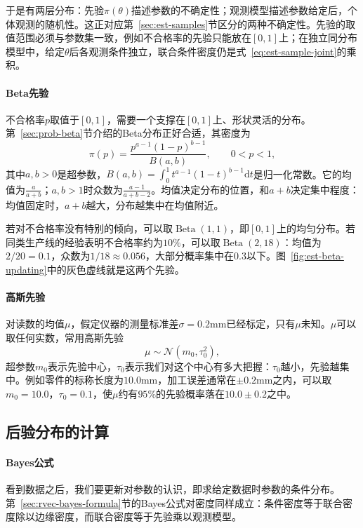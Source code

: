 于是有两层分布：先验$\pi(\theta)$描述参数的不确定性；观测模型描述参数给定后，个体观测的随机性。这正对应第~\ref{sec:est-samples}节区分的两种不确定性。先验的取值范围必须与参数集一致，例如不合格率的先验只能放在$[0,1]$上；在独立同分布模型中，给定$\theta$后各观测条件独立，联合条件密度仍是式~\eqref{eq:est-sample-joint}的乘积。

\paragraph{Beta先验}
不合格率$p$取值于$[0,1]$，需要一个支撑在$[0,1]$上、形状灵活的分布。第~\ref{sec:prob-beta}节介绍的Beta分布正好合适，其密度为
\[
\pi(p)=\frac{p^{a-1}(1-p)^{b-1}}{B(a,b)},\qquad 0<p<1,
\]
其中$a,b>0$是超参数，$B(a,b)=\int_0^1t^{a-1}(1-t)^{b-1}\mathrm{d}t$是归一化常数。它的均值为$\frac{a}{a+b}$；$a,b>1$时众数为$\frac{a-1}{a+b-2}$。均值决定分布的位置，和$a+b$决定集中程度：均值固定时，$a+b$越大，分布越集中在均值附近。

\begin{example}[两个Beta先验]
\label{ex:est-beta-priors}
若对不合格率没有特别的倾向，可以取$\operatorname{Beta}(1,1)$，即$[0,1]$上的均匀分布。若同类生产线的经验表明不合格率约为$10\%$，可以取$\operatorname{Beta}(2,18)$：均值为$2/20=0.1$，众数为$1/18\approx0.056$，大部分概率集中在$0.3$以下。图~\ref{fig:est-beta-updating}中的灰色虚线就是这两个先验。
\end{example}

\paragraph{高斯先验}
对读数的均值$\mu$，假定仪器的测量标准差$\sigma=0.2$mm已经标定，只有$\mu$未知。$\mu$可以取任何实数，常用高斯先验
\[
\mu\sim\mathcal{N}(m_0,\tau_0^2),
\]
超参数$m_0$表示先验中心，$\tau_0$表示我们对这个中心有多大把握：$\tau_0$越小，先验越集中。例如零件的标称长度为$10.0$mm，加工误差通常在$\pm0.2$mm之内，可以取$m_0=10.0$，$\tau_0=0.1$，使$\mu$约有$95\%$的先验概率落在$10.0\pm0.2$之中。

\subsection{后验分布的计算}
\label{sec:est-posterior}

\paragraph{Bayes公式}
看到数据之后，我们要更新对参数的认识，即求给定数据时参数的条件分布。第~\ref{sec:rvec-bayes-formula}节的Bayes公式对密度同样成立：条件密度等于联合密度除以边缘密度，而联合密度等于先验乘以观测模型。

